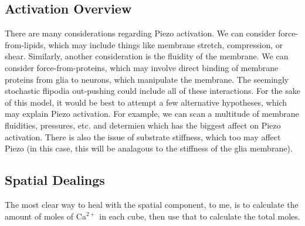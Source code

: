 \documentclass[12pt]{amsart}
\begin{document}
\subsection{Activation Overview} There are many considerations regarding Piezo activation. We can consider force-from-lipids, which may include things like membrane stretch, compression, or shear. Similarly, another consideration is the fluidity of the membrane. We can consider force-from-proteins, which may involve direct binding of membrane proteins from glia to neurons, which manipulate the membrane. The seemingly stochastic flipodia out-pushing could include all of these interactions. For the sake of this model, it would be best to attempt a few alternative hypotheses, which may explain Piezo activation. For example, we can scan a multitude of membrane fluidities, pressures, etc. and determien which has the biggest affect on Piezo activation. There is also the issue of substrate stiffness, which too may affect Piezo (in this case, this will be analagous to the stiffness of the glia membrane).\newline 

\subsection{Spatial Dealings} The most clear way to heal with the spatial component, to me, is to calculate the amount of moles of Ca$^{2+}$ in each cube, then use that to calculate the total moles. 
\end{document}
